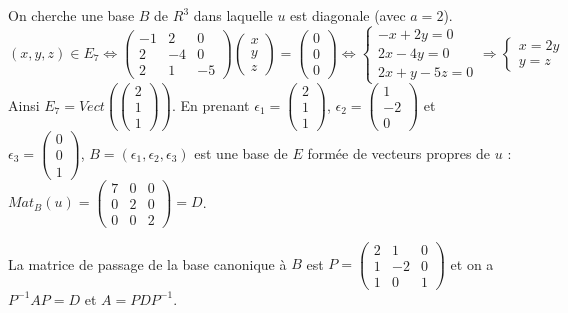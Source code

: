 \documentclass[a4paper,10pt]{book} %
\begin{document}
On cherche une base $B$ de $R^3$ dans laquelle $u$ est diagonale (avec $a=2$).\\
$(x,y,z)\in E_7\Leftrightarrow \begin{pmatrix}
-1&2&0\\2&-4&0\\2&1&-5
\end{pmatrix}\begin{pmatrix}
x\\y\\z
\end{pmatrix}=\begin{pmatrix}
0\\0\\0
\end{pmatrix}
\Leftrightarrow\left\{\begin{array}{c}
-x+2y=0\\2x-4y=0\\2x+y-5z=0
\end{array}\right. \Rightarrow 
\left\{\begin{array}{c}
x=2y\\y=z
\end{array}\right.$\\

Ainsi $E_7=Vect(\begin{pmatrix}
2\\1\\1
\end{pmatrix})$.
En prenant $\epsilon_1=\begin{pmatrix}
2\\1\\1
\end{pmatrix}$, $\epsilon_2=\begin{pmatrix}
1\\-2\\0
\end{pmatrix}$ et $\epsilon_3=\begin{pmatrix}
0\\0\\1
\end{pmatrix}$, $B=(\epsilon_1,\epsilon_2,\epsilon_3)$ est une base de $E$ formée de vecteurs propres de $u$ : $Mat_B(u)=\begin{pmatrix}
7&0&0\\0&2&0\\0&0&2\end{pmatrix}=D$.

La matrice de passage de la base canonique à $B$ est $P=\begin{pmatrix}
2&1&0\\1&-2&0\\1&0&1
\end{pmatrix}$ et on a $P^{-1}AP=D$ et $A=PDP^{-1}$.
\end{document}
